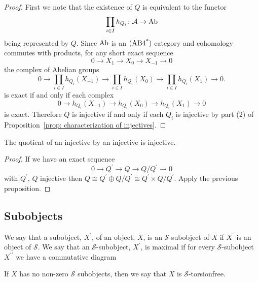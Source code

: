 \documentclass[dissertation.tex]{subfiles}
\begin{document}
\begin{proof}
  First we note that the existence of $Q$ is equivalent to the functor
  $$\prod_{i \in I} h_{Q_i} \colon \mathcal{A} \to \operatorname{Ab}$$
  being represented by $Q$.
  Since $\operatorname{Ab}$ is an $(\operatorname{AB4^*})$ category and cohomology commutes with products, for any short exact sequence 
  $$0 \to X_1\to X_0 \to X_{-1} \to 0$$
  the complex of Abelian groups
  $$0 \to \prod_{i \in I}h_{Q_i}(X_{-1}) \to \prod_{i \in I}h_{Q_i}(X_0) \to \prod_{i \in I}h_{Q_i}(X_1) \to 0.$$
  is exact if and only if each complex
  $$0 \to h_{Q_i}(X_{-1}) \to h_{Q_i}(X_0) \to h_{Q_i}(X_1) \to 0$$
  is exact.
  Therefore $Q$ is injective if and only if each $Q_i$ is injective by part (2) of Proposition~\ref{prop: characterization of injectives}.
\end{proof}

\begin{cor}
  The quotient of an injective by an injective is injective.
\end{cor}

\begin{proof}
  If we have an exact sequence
  $$0 \to Q^\prime \to Q \to Q/Q^\prime \to 0$$
  with $Q^\prime$, $Q$ injective then $Q \cong Q^\prime \oplus Q/Q^\prime \cong Q^\prime \times Q/Q^\prime$.
  Apply the previous proposition.
\end{proof}

\subsection{Subobjects}
\begin{defn}
  We say that a subobject, $X^\prime$, of an object, $X$, is an $\mathcal{S}$-subobject of $X$ if $X^\prime$ is an object of $\mathcal{S}$.
  We say that an $\mathcal{S}$-subobject, $X^\prime$, is maximal if for every $\mathcal{S}$-subobject $X^{\prime\prime}$ we have a commutative diagram
  \begin{center}
  \end{center}
  
  If $X$ has no non-zero $\mathcal{S}$ subobjects, then we say that $X$ is $\mathcal{S}$-torsionfree.
\end{defn}
\end{document}
